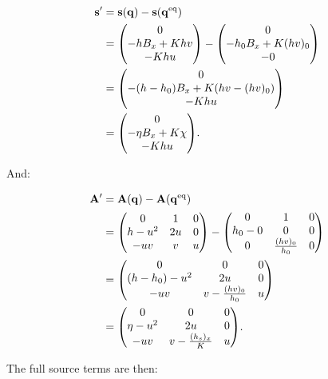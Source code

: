 \begin{align}
  \vb s' &= \vb s(\vb q) - \vb s(\eq{\vb q}) \\
  &= \mqty(0 \\ -h B_x + K h v \\ - K h u) - \mqty(0 \\ -h_0 B_x + K (hv)_0 \\ - 0) \\
  &= \mqty(0 \\ -(h-h_0) B_x + K (hv - (hv)_0) \\ - K h u) \\
  &= \mqty(0 \\ -\eta B_x + K \chi \\ - K h u).
\end{align}

And:

\begin{align}
  \vb A' &= \vb A(\vb q) - \vb A(\eq{\vb q}) \\
  &= \mqty(
    0 & 1 & 0 \\
    h - u^2 & 2u & 0 \\
    -uv & v & u
  ) - \mqty(
    0 & 1 & 0 \\
    h_0 - 0 & 0 & 0 \\
    0 & \frac{(hv)_0}{h_0} & 0
  ) \\
  &= \mqty(
    0 & 0 & 0 \\
    (h - h_0) - u^2 & 2u & 0 \\
    -uv & v - \frac{(hv)_0}{h_0} & u
  ) \\
  &= \mqty(
    0 & 0 & 0 \\
    \eta - u^2 & 2u & 0 \\
    -uv & v - \frac{(h_s)_x}{K} & u
  ).
\end{align}

The full source terms are then:

